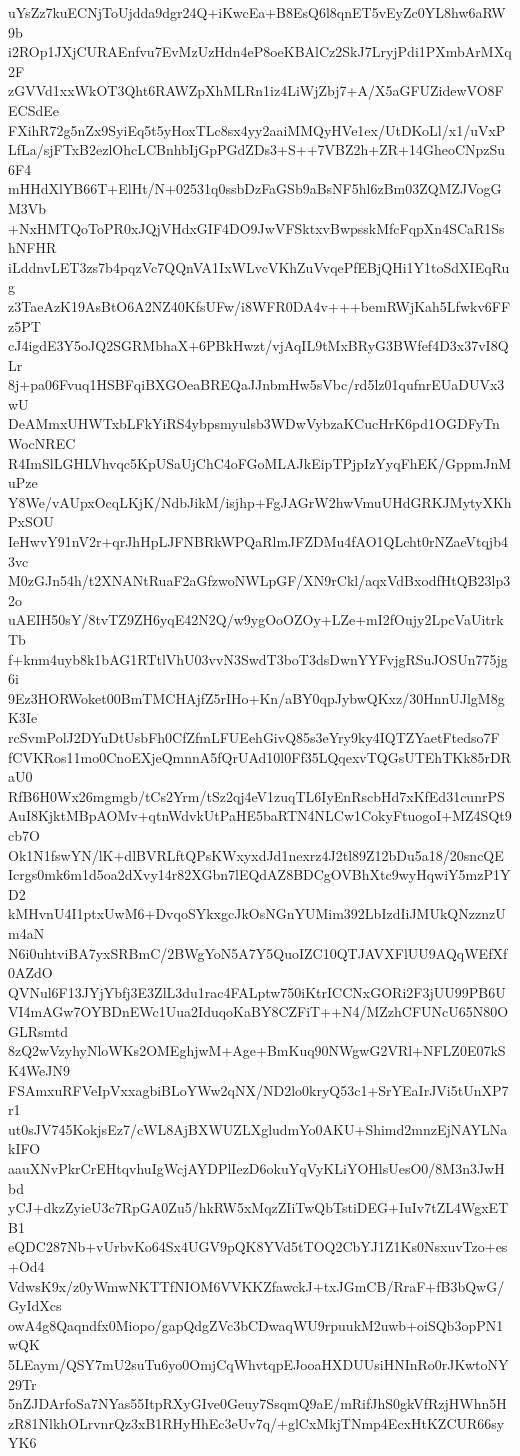 uYsZz7kuECNjToUjdda9dgr24Q+iKwcEa+B8EsQ6l8qnET5vEyZc0YL8hw6aRW9b
i2ROp1JXjCURAEnfvu7EvMzUzHdn4eP8oeKBAlCz2SkJ7LryjPdi1PXmbArMXq2F
zGVVd1xxWkOT3Qht6RAWZpXhMLRn1iz4LiWjZbj7+A/X5aGFUZidewVO8FECSdEe
FXihR72g5nZx9SyiEq5t5yHoxTLc8sx4yy2aaiMMQyHVe1ex/UtDKoLl/x1/uVxP
LfLa/sjFTxB2ezlOhcLCBnhbIjGpPGdZDs3+S++7VBZ2h+ZR+14GheoCNpzSu6F4
mHHdXlYB66T+ElHt/N+02531q0ssbDzFaGSb9aBsNF5hl6zBm03ZQMZJVogGM3Vb
+NxHMTQoToPR0xJQjVHdxGIF4DO9JwVFSktxvBwpsskMfcFqpXn4SCaR1SshNFHR
iLddnvLET3zs7b4pqzVc7QQnVA1IxWLvcVKhZuVvqePfEBjQHi1Y1toSdXIEqRug
z3TaeAzK19AsBtO6A2NZ40KfsUFw/i8WFR0DA4v+++bemRWjKah5Lfwkv6FFz5PT
cJ4igdE3Y5oJQ2SGRMbhaX+6PBkHwzt/vjAqIL9tMxBRyG3BWfef4D3x37vI8QLr
8j+pa06Fvuq1HSBFqiBXGOeaBREQaJJnbmHw5sVbc/rd5lz01qufnrEUaDUVx3wU
DeAMmxUHWTxbLFkYiRS4ybpsmyulsb3WDwVybzaKCucHrK6pd1OGDFyTnWocNREC
R4ImSlLGHLVhvqc5KpUSaUjChC4oFGoMLAJkEipTPjpIzYyqFhEK/GppmJnMuPze
Y8We/vAUpxOcqLKjK/NdbJikM/isjhp+FgJAGrW2hwVmuUHdGRKJMytyXKhPxSOU
IeHwvY91nV2r+qrJhHpLJFNBRkWPQaRlmJFZDMu4fAO1QLcht0rNZaeVtqjb43vc
M0zGJn54h/t2XNANtRuaF2aGfzwoNWLpGF/XN9rCkl/aqxVdBxodfHtQB23lp32o
uAEIH50sY/8tvTZ9ZH6yqE42N2Q/w9ygOoOZOy+LZe+mI2fOujy2LpcVaUitrkTb
f+knm4uyb8k1bAG1RTtlVhU03vvN3SwdT3boT3dsDwnYYFvjgRSuJOSUn775jg6i
9Ez3HORWoket00BmTMCHAjfZ5rIHo+Kn/aBY0qpJybwQKxz/30HnnUJlgM8gK3Ie
rcSvmPolJ2DYuDtUsbFh0CfZfmLFUEehGivQ85s3eYry9ky4IQTZYaetFtedso7F
fCVKRos11mo0CnoEXjeQmnnA5fQrUAd10l0Ff35LQqexvTQGsUTEhTKk85rDRaU0
RfB6H0Wx26mgmgb/tCs2Yrm/tSz2qj4eV1zuqTL6IyEnRscbHd7xKfEd31cunrPS
AuI8KjktMBpAOMv+qtnWdvkUtPaHE5baRTN4NLCw1CokyFtuogoI+MZ4SQt9cb7O
Ok1N1fswYN/lK+dlBVRLftQPsKWxyxdJd1nexrz4J2tl89Z12bDu5a18/20sncQE
Icrgs0mk6m1d5oa2dXvy14r82XGbn7lEQdAZ8BDCgOVBhXtc9wyHqwiY5mzP1YD2
kMHvnU4I1ptxUwM6+DvqoSYkxgcJkOsNGnYUMim392LbIzdIiJMUkQNzznzUm4aN
N6i0uhtviBA7yxSRBmC/2BWgYoN5A7Y5QuoIZC10QTJAVXFlUU9AQqWEfXf0AZdO
QVNul6F13JYjYbfj3E3ZlL3du1rac4FALptw750iKtrICCNxGORi2F3jUU99PB6U
VI4mAGw7OYBDnEWc1Uua2IduqoKaBY8CZFiT++N4/MZzhCFUNcU65N80OGLRsmtd
8zQ2wVzyhyNloWKs2OMEghjwM+Age+BmKuq90NWgwG2VRl+NFLZ0E07kSK4WeJN9
FSAmxuRFVeIpVxxagbiBLoYWw2qNX/ND2lo0kryQ53c1+SrYEaIrJVi5tUnXP7r1
ut0sJV745KokjsEz7/cWL8AjBXWUZLXgludmYo0AKU+Shimd2mnzEjNAYLNakIFO
aauXNvPkrCrEHtqvhuIgWcjAYDPlIezD6okuYqVyKLiYOHlsUesO0/8M3n3JwHbd
yCJ+dkzZyieU3c7RpGA0Zu5/hkRW5xMqzZIiTwQbTstiDEG+IuIv7tZL4WgxETB1
eQDC287Nb+vUrbvKo64Sx4UGV9pQK8YVd5tTOQ2CbYJ1Z1Ks0NsxuvTzo+es+Od4
VdwsK9x/z0yWmwNKTTfNIOM6VVKKZfawckJ+txJGmCB/RraF+fB3bQwG/GyIdXcs
owA4g8Qaqndfx0Miopo/gapQdgZVc3bCDwaqWU9rpuukM2uwb+oiSQb3opPN1wQK
5LEaym/QSY7mU2suTu6yo0OmjCqWhvtqpEJooaHXDUUsiHNInRo0rJKwtoNY29Tr
5nZJDArfoSa7NYas55ItpRXyGIve0Geuy7SsqmQ9aE/mRifJhS0gkVfRzjHWhn5H
zR81NlkhOLrvnrQz3xB1RHyHhEc3eUv7q/+glCxMkjTNmp4EcxHtKZCUR66syYK6
